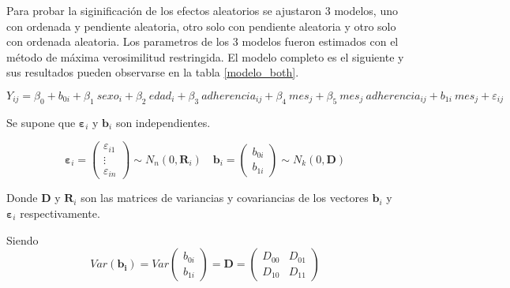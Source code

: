 \documentclass[spanish]{article}
\numberwithin{figure}{subsection}
\numberwithin{equation}{subsection}
\numberwithin{table}{subsection}
\begin{document}
Para probar la siginificación de los efectos aleatorios se ajustaron 3 modelos,
uno con ordenada y pendiente aleatoria, otro solo con pendiente aleatoria y otro
solo con ordenada aleatoria. Los parametros de los 3 modelos fueron estimados
con el método de máxima verosimilitud restringida. El modelo completo es el
siguiente y sus resultados pueden observarse en la tabla \ref{modelo_both}.

\[
	Y_{ij} = \beta_0 + b_{0i} + \beta_1\ sexo_i + \beta_2\ edad_i + \beta_3\ adherencia_{ij}
	+ \beta_4\ mes_j + \beta_5\ mes_j\ adherencia_{ij} + b_{1i}\ mes_j + \varepsilon_{ij}
\]

Se supone que $\bm{\varepsilon}_i$ y $\bm{b}_i$ son independientes.

\[ 
	\bm{\varepsilon}_i = \begin{pmatrix} \varepsilon_{i1} \\ \vdots \\ \varepsilon_{in} \end{pmatrix} \sim N_{n}(0, \bm{R}_i)
	\quad
	\bm{b}_i = \begin{pmatrix} b_{0i} \\ b_{1i} \end{pmatrix} \sim N_k(0, \bm{D})
\]

Donde $\bm{D}$ y $\bm{R}_i$ son las matrices de variancias y covariancias de los
vectores $\bm{b}_i$ y $\bm{\varepsilon}_i$ respectivamente.

Siendo \[
	Var(\bm{b_i}) = Var\begin{pmatrix} b_{0i} \\ b_{1i} \end{pmatrix}
	= \bm{D} = \begin{pmatrix} D_{00} & D_{01} \\ D_{10} & D_{11} \end{pmatrix}
\]
\end{document}
